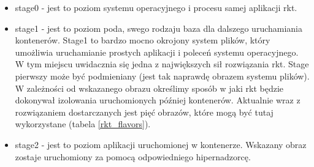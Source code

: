 \documentclass[10pt,a4paper,titlepage,twoside]{report}
\begin{document}
\begin{itemize}
\item stage0 - jest to poziom systemu operacyjnego i procesu samej aplikacji rkt.
\item stage1 - jest to poziom poda, swego rodzaju baza dla dalszego uruchamiania kontenerów. Stage1 to bardzo mocno okrojony system plików, który umożliwia uruchamianie prostych aplikacji i poleceń systemu operacyjnego. W tym miejscu uwidacznia się jedna z największych sił rozwiązania rkt. Stage pierwszy może być podmieniany (jest tak naprawdę obrazem systemu plików). W zależności od wskazanego obrazu określimy sposób w jaki rkt będzie dokonywał izolowania uruchomionych później kontenerów. Aktualnie wraz z rozwiązaniem dostarczanych jest pięć obrazów, które mogą być tutaj wykorzystane (tabela \ref{rkt_flavors}).
\item stage2 - jest to poziom aplikacji uruchomionej w kontenerze. Wskazany obraz zostaje uruchomiony za pomocą odpowiedniego hipernadzorcę.
\end{itemize}
\end{document}
